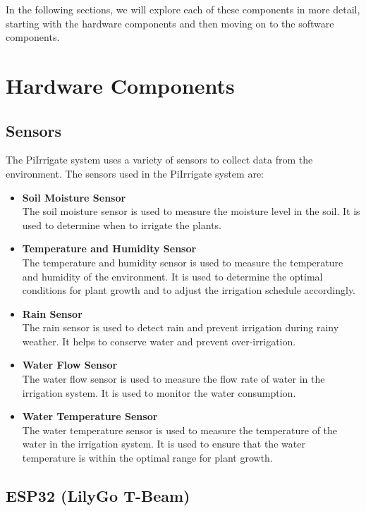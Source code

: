 In the following sections, we will explore each of these components in more detail,
starting with the hardware components and then moving on to the software components.

\section{Hardware Components}
\subsection{Sensors}
The PiIrrigate system uses a variety of sensors to collect data from the environment.
The sensors used in the PiIrrigate system are:
\begin{itemize}
  \item \textbf{Soil Moisture Sensor} \\
  The soil moisture sensor is used to measure the moisture level in the soil. It is used to determine when to irrigate the plants.

  \item \textbf{Temperature and Humidity Sensor} \\
  The temperature and humidity sensor is used to measure the temperature and humidity of the environment.
  It is used to determine the optimal conditions for plant growth and to adjust the irrigation schedule accordingly.

  \item \textbf{Rain Sensor} \\
  The rain sensor is used to detect rain and prevent irrigation during rainy weather. 
  It helps to conserve water and prevent over-irrigation.

  \item \textbf{Water Flow Sensor} \\
  The water flow sensor is used to measure the flow rate of water in the irrigation system.
  It is used to monitor the water consumption.

  \item \textbf{Water Temperature Sensor} \\
  The water temperature sensor is used to measure the temperature of the water in the irrigation system.
  It is used to ensure that the water temperature is within the optimal range for plant growth.

\end{itemize}
\subsection{ESP32 (LilyGo T-Beam)}

